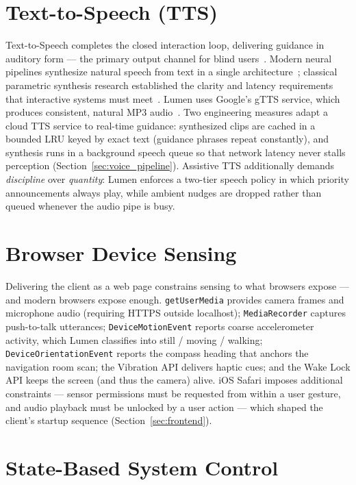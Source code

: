 \section{Text-to-Speech (TTS)}

Text-to-Speech completes the closed interaction loop, delivering guidance in auditory
form --- the primary output channel for blind users~\cite{preece2015interaction}.
Modern neural pipelines synthesize natural speech from text in a single
architecture~\cite{wang2017tacotron}; classical parametric synthesis research
established the clarity and latency requirements that interactive systems must
meet~\cite{zen2009parametric}. Lumen uses Google's gTTS service, which produces
consistent, natural MP3 audio~\cite{googlecloudtts}. Two engineering measures adapt a
cloud TTS service to real-time guidance: synthesized clips are cached in a bounded
LRU keyed by exact text (guidance phrases repeat constantly), and synthesis runs in a
background speech queue so that network latency never stalls perception
(Section~\ref{sec:voice_pipeline}). Assistive TTS additionally demands
\emph{discipline} over \emph{quantity}: Lumen enforces a two-tier speech policy in
which priority announcements always play, while ambient nudges are dropped rather
than queued whenever the audio pipe is busy.

\section{Browser Device Sensing}

Delivering the client as a web page constrains sensing to what browsers expose ---
and modern browsers expose enough. \texttt{getUserMedia} provides camera frames and
microphone audio (requiring HTTPS outside localhost); \texttt{MediaRecorder}
captures push-to-talk utterances; \texttt{DeviceMotionEvent} reports coarse
accelerometer activity, which Lumen classifies into still / moving / walking;
\texttt{DeviceOrientationEvent} reports the compass heading that anchors the
navigation room scan; the Vibration API delivers haptic cues; and the Wake Lock API
keeps the screen (and thus the camera) alive. iOS Safari imposes additional
constraints --- sensor permissions must be requested from within a user gesture, and
audio playback must be unlocked by a user action --- which shaped the client's
startup sequence (Section~\ref{sec:frontend}).

\section{State-Based System Control}

